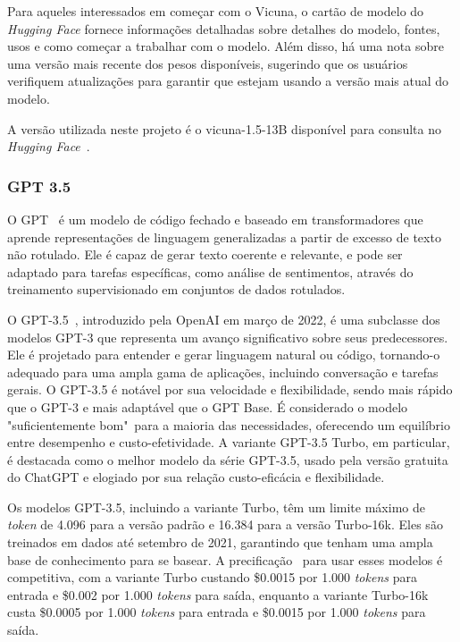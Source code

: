Para aqueles interessados em começar com o Vicuna, o cartão de modelo do \textit{Hugging Face} fornece informações detalhadas sobre detalhes do modelo, fontes, usos e como começar a trabalhar com o modelo. Além disso, há uma nota sobre uma versão mais recente dos pesos disponíveis, sugerindo que os usuários verifiquem atualizações para garantir que estejam usando a versão mais atual do modelo.

A versão utilizada neste projeto é o vicuna-1.5-13B disponível para consulta no \textit{Hugging Face}~\cite{vicuna1513b}.

\subsubsection{GPT 3.5}
\label{cap:fund_teorica:sec:modelos:subsec:gpt}

O GPT~\cite{enwiki:1226113577} é um modelo de código fechado e baseado em transformadores que aprende representações de linguagem generalizadas a partir de excesso de texto não rotulado. Ele é capaz de gerar texto coerente e relevante, e pode ser adaptado para tarefas específicas, como análise de sentimentos, através do treinamento supervisionado em conjuntos de dados rotulados.

O GPT-3.5~\cite{openai:gpt35turbo}, introduzido pela OpenAI em março de 2022, é uma subclasse dos modelos GPT-3 que representa um avanço significativo sobre seus predecessores. Ele é projetado para entender e gerar linguagem natural ou código, tornando-o adequado para uma ampla gama de aplicações, incluindo conversação e tarefas gerais. O GPT-3.5 é notável por sua velocidade e flexibilidade, sendo mais rápido que o GPT-3 e mais adaptável que o GPT Base. É considerado o modelo "suficientemente bom"\ para a maioria das necessidades, oferecendo um equilíbrio entre desempenho e custo-efetividade. A variante GPT-3.5 Turbo, em particular, é destacada como o melhor modelo da série GPT-3.5, usado pela versão gratuita do ChatGPT e elogiado por sua relação custo-eficácia e flexibilidade.

Os modelos GPT-3.5, incluindo a variante Turbo, têm um limite máximo de \textit{token} de 4.096 para a versão padrão e 16.384 para a versão Turbo-16k. Eles são treinados em dados até setembro de 2021, garantindo que tenham uma ampla base de conhecimento para se basear. A precificação~\cite{openai:gptpricing} para usar esses modelos é competitiva, com a variante Turbo custando \$0.0015 por 1.000 \textit{tokens} para entrada e \$0.002 por 1.000 \textit{tokens} para saída, enquanto a variante Turbo-16k custa \$0.0005 por 1.000 \textit{tokens} para entrada e \$0.0015 por 1.000 \textit{tokens} para saída.


